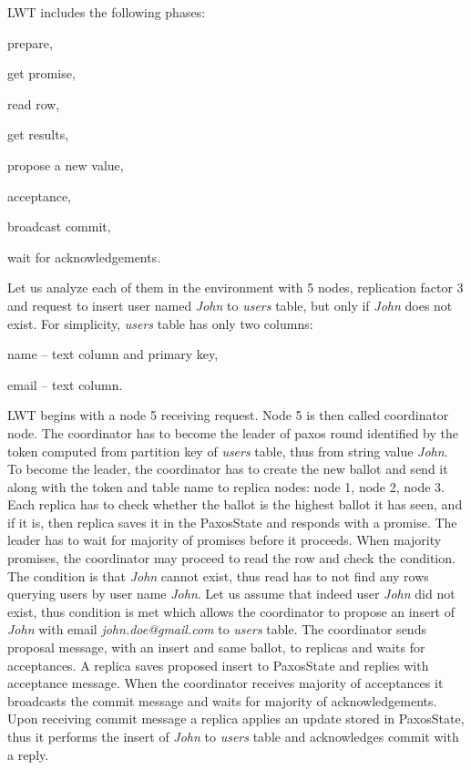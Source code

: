 LWT includes the following phases: \begin{enumerate*}
\item prepare,
\item get promise,
\item read row,
\item get results,
\item propose a new value,
\item acceptance,
\item broadcast commit,
\item wait for acknowledgements.
\end{enumerate*} Let us analyze each of them in the environment with 5 nodes, replication factor 3 and request to insert user named \emph{John} to \emph{users} table, but only if \emph{John} does not exist. For simplicity, \emph{users} table has only two columns: \begin{enumerate*} 
\item name -- text column and primary key, \item email -- text column. \end{enumerate*} LWT begins with a node 5 receiving request. Node 5 is then called coordinator node. The coordinator has to become the leader of paxos round identified by the token computed from partition key of \emph{users} table, thus from string value \emph{John}. To become the leader, the coordinator has to create the new ballot and send it along with the token and table name to replica nodes: node 1, node 2, node 3. Each replica has to check whether the ballot is the highest ballot it has seen, and if it is, then replica saves it in the PaxosState and responds with a promise. The leader has to wait for majority of promises before it proceeds. When majority promises, the coordinator may proceed to read the row and check the condition. The condition is that \emph{John} cannot exist, thus read has to not find any rows querying users by user name \emph{John}. Let us assume that indeed user \emph{John} did not exist, thus condition is met which allows the coordinator to propose an insert of \emph{John} with email \emph{john.doe@gmail.com} to \emph{users} table. The coordinator sends proposal message, with an insert and same ballot, to replicas and waits for acceptances. A replica saves proposed insert to PaxosState and replies with acceptance message.
When the coordinator receives majority of acceptances it broadcasts the commit message and waits for majority of acknowledgements. Upon receiving commit message a replica applies an update stored in PaxosState, thus it performs the insert of \emph{John} to \emph{users} table and acknowledges commit with a reply.

